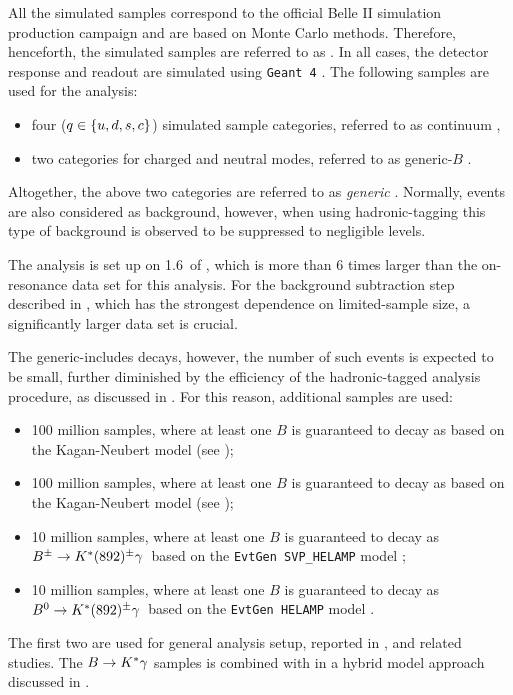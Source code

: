 All the simulated samples correspond to the official Belle II simulation production campaign and are based on Monte Carlo methods.
Therefore, henceforth, the simulated samples are referred to as \MC.
In all cases, the detector response and readout are simulated using \texttt{Geant~4} \cite{GEANT4:2002zbu}.
The following samples are used for the analysis:
\begin{itemize}
    \item four \epem\ra\qqbar ($q\in\{u,d,s,c\}$) simulated sample categories, referred to as continuum \MC,
    \item two \FourS\ra\BB categories for charged and neutral \B modes, referred to as generic-$B$ \MC.
\end{itemize}
Altogether, the above two categories are referred to as \textit{generic} \MC.
Normally, \epem\ra\tautau events are also considered as background, however, when using hadronic-tagging this type of background is observed to be suppressed to negligible levels.

The analysis is set up on 1.6~\invab of \MC, which is more than 6 times larger than the on-resonance data set for this analysis.
For the background subtraction step described in , which has the strongest dependence on limited-\MC sample size, a significantly larger data set is crucial.

The generic-\B \MC includes \BtoXsgamma decays, however, the number of such events is expected to be small, further diminished by the efficiency of the hadronic-tagged analysis procedure, as discussed in .
For this reason, additional samples are used:
\begin{itemize}
    \item 100 million \BpBm samples, where at least one $B$ is guaranteed to decay as \BptoXsgamma based on the Kagan-Neubert model \cite{Kagan:1998ym} (see );
    \item 100 million \BzBzb samples, where at least one $B$ is guaranteed to decay as \BztoXsgamma based on the Kagan-Neubert model \cite{Kagan:1998ym} (see );
    \item 10 million \BpBm samples, where at least one $B$ is guaranteed to decay as $B^\pm\rightarrow K^*(892)^{\pm}\gamma$~based on the \texttt{EvtGen SVP\_HELAMP} model \cite{Ryd:2005zz};
    \item 10 million \BzBzb samples, where at least one $B$ is guaranteed to decay as $B^0\rightarrow K^*(892)^{\pm}\gamma$~based on the \texttt{EvtGen HELAMP} model \cite{Ryd:2005zz}.
\end{itemize}
The first two are used for general analysis setup, reported in 
, and related studies.
The $B\rightarrow K^*\gamma$ samples is combined with \BtoXsgamma in a hybrid model approach \cite{Ramirez:1989yk} discussed in .

